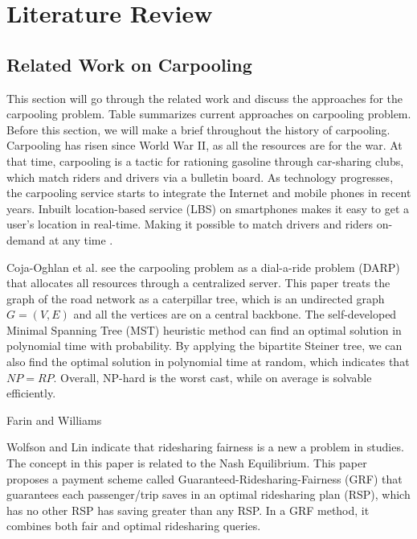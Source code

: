 
\chapter{Literature Review}

\section{Related Work on Carpooling}

This section will go through the related work and discuss the approaches for the carpooling problem. Table summarizes current approaches on carpooling problem. Before this section, we will make a brief throughout the history of carpooling. Carpooling has risen since World War II, as all the resources are for the war. At that time, carpooling is a tactic for rationing gasoline through car-sharing clubs, which match riders and drivers via a bulletin board. As technology progresses, the carpooling service starts to integrate the Internet and mobile phones in recent years. Inbuilt location-based service (LBS) on smartphones makes it easy to get a user's location in real-time. Making it possible to match drivers and riders on-demand at any time \cite{chan_ridesharing_2012}.

Coja-Oghlan et al. \cite{coja-oghlan_average_2003} see the carpooling problem as a dial-a-ride problem (DARP) that allocates all resources through a centralized server. This paper treats the graph of the road network as a caterpillar tree, which is an undirected graph $G = (V, E)$ and all the vertices are on a central backbone. The self-developed Minimal Spanning Tree (MST) heuristic method can find an optimal solution in polynomial time with probability. By applying the bipartite Steiner tree, we can also find the optimal solution in polynomial time at random, which indicates that $NP = RP$. Overall, NP-hard is the worst cast, while on average is solvable efficiently.

Farin and Williams \cite{fagin_fair_1983} 

Wolfson and Lin \cite{wolfson_fairness_2017} indicate that ridesharing fairness is a new a problem in studies. The concept in this paper is related to the Nash Equilibrium. This paper proposes a payment scheme called Guaranteed-Ridesharing-Fairness (GRF) that guarantees each passenger/trip saves in an optimal ridesharing plan (RSP), which has no other RSP has saving greater than any RSP. In a GRF method, it combines both fair and optimal ridesharing queries.

